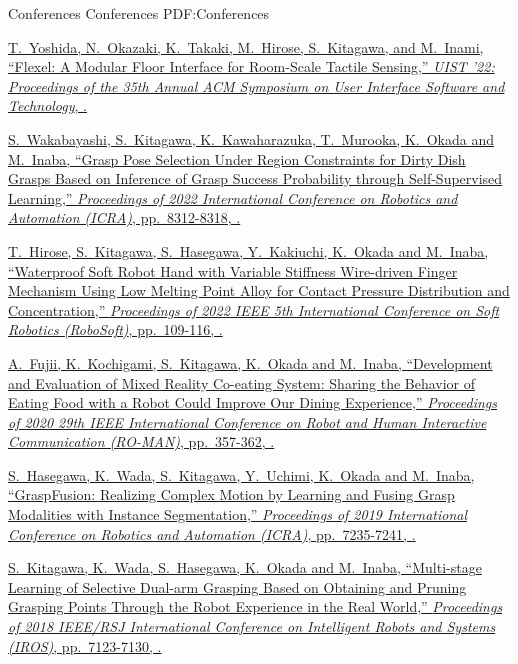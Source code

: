\documentclass[letterpaper,MMMyyyy,nonstopmode]{simpleresumecv}
\begin{document}
\begin{Body}
\endgroup

\BigGap
\SubSection
{Conferences}
{Conferences}
{PDF:Conferences}

\begingroup

\BulletItem
\href{https://doi.org/10.1145/3526113.3545699}
{T.~Yoshida, N.~Okazaki, K.~Takaki, M.~Hirose, \underline{S.~Kitagawa}, and M.~Inami,
``Flexel: A Modular Floor Interface for Room-Scale Tactile Sensing,''
\textit{UIST '22: Proceedings of the 35th Annual ACM Symposium on User Interface Software and Technology},
.}

\BulletItem
\href{https://doi.org/10.1109/ICRA46639.2022.9812084}
{S.~Wakabayashi, \underline{S.~Kitagawa}, K.~Kawaharazuka, T.~Murooka, K.~Okada and M.~Inaba,
``Grasp Pose Selection Under Region Constraints for Dirty Dish Grasps Based on Inference of Grasp Success Probability through Self-Supervised Learning,''
\textit{Proceedings of 2022 International Conference on Robotics and Automation (ICRA)},
pp.~8312-8318,
.}

\BulletItem
\href{https://doi.org/10.1109/RoboSoft54090.2022.9762208}
{T.~Hirose, \underline{S.~Kitagawa}, S.~Hasegawa, Y.~Kakiuchi, K.~Okada and M.~Inaba,
``Waterproof Soft Robot Hand with Variable Stiffness Wire-driven Finger Mechanism Using Low Melting Point Alloy for Contact Pressure Distribution and Concentration,''
\textit{Proceedings of 2022 IEEE 5th International Conference on Soft Robotics (RoboSoft)},
pp.~109-116,
.}

\BulletItem
\href{https://doi.org/10.1109/RO-MAN47096.2020.9223518}
{A.~Fujii, K.~Kochigami, \underline{S.~Kitagawa}, K.~Okada and M.~Inaba,
``Development and Evaluation of Mixed Reality Co-eating System: Sharing the Behavior of Eating Food with a Robot Could Improve Our Dining Experience,''
\textit{Proceedings of 2020 29th IEEE International Conference on Robot and Human Interactive Communication (RO-MAN)},
pp.~357-362,
.}

\BulletItem
\href{https://doi.org/10.1109/ICRA.2019.8793710}
{S.~Hasegawa, K.~Wada, \underline{S.~Kitagawa}, Y.~Uchimi, K.~Okada and M.~Inaba,
``GraspFusion: Realizing Complex Motion by Learning and Fusing Grasp Modalities with Instance Segmentation,''
\textit{Proceedings of 2019 International Conference on Robotics and Automation (ICRA)},
pp.~7235-7241,
.}

\BulletItem
\href{https://doi.org/10.1109/IROS.2018.8593752}
{\underline{S.~Kitagawa}, K.~Wada, S.~Hasegawa, K.~Okada and M.~Inaba,
``Multi-stage Learning of Selective Dual-arm Grasping Based on Obtaining and Pruning Grasping Points Through the Robot Experience in the Real World,''
\textit{Proceedings of 2018 IEEE/RSJ International Conference on Intelligent Robots and Systems (IROS)},
pp.~7123-7130,
.}


\end{Body}
\end{document}
